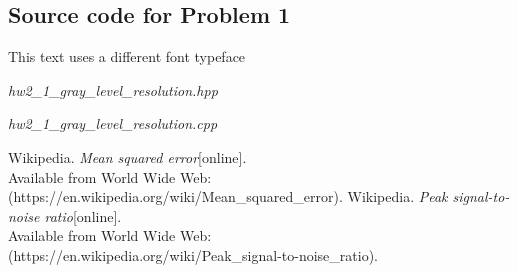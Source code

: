 \documentclass[a4paper, 11pt]{article}
\begin{document}
\subsection*{Source code for Problem 1}
\begin{tcolorbox}[colback=black!2!white,colframe=black!30!white]
  {\selectfont
  \color{gray}This text uses a different font typeface 
  }
\end{tcolorbox}
\it{hw2\_1\_gray\_level\_resolution.hpp}
\begin{figure}[h]
  \centering
\end{figure}
\newpage
\it{hw2\_1\_gray\_level\_resolution.cpp}
\begin{figure}[h!]
  \centering
\end{figure}
\begin{figure}[h!]
  \centering
\end{figure}
\begin{figure}[h!]
  \centering
\end{figure}
\newline
\begin{thebibliography}{9}
   Wikipedia. \emph{Mean squared error}[online]. \\
  Available from World Wide Web: (https://en.wikipedia.org/wiki/Mean\_squared\_error).
   Wikipedia. \emph{Peak signal-to-noise ratio}[online].\\
  Available from World Wide Web: \\
  (https://en.wikipedia.org/wiki/Peak\_signal-to-noise\_ratio).
\end{thebibliography}
\end{document}
